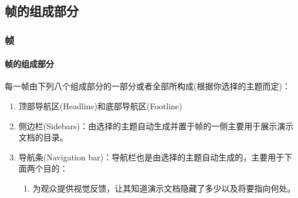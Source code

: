 \documentclass{beamer}
\begin{document}
\subsection{帧的组成部分}
\begin{frame}
\frametitle{帧}
\framesubtitle{帧的组成部分}
每一帧由下列八个组成部分的一部分或者全部所构成(根据你选择的主题而定)：
\begin{enumerate}
	\item 顶部导航区(Headline)和底部导航区(Footline)
	\item 侧边栏(Sidebars)：由选择的主题自动生成并置于帧的一侧主要用于展示演示文档的目录。
	\item 导航条(Navigation bar)：导航栏也是由选择的主题自动生成的，主要用于下面两个目的：
	\begin{enumerate}
		\item 为观众提供视觉反馈，让其知道演示文档隐藏了多少以及将要指向何处。

\end{enumerate}
\end{enumerate}
\end{frame}
\end{document}
